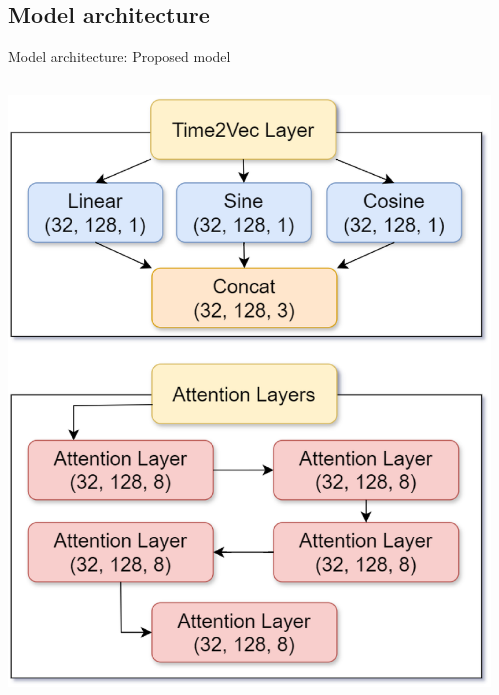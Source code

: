 \documentclass[compress, mathserif, fleqn, 10pt]{beamer}
\begin{document}
	\subsection{Model architecture}
	\begin{frame}{Model architecture: Proposed model}
		\begin{columns}
			\begin{column}{0.45\textwidth}
				\centerline{\includegraphics[width=\textwidth]{images/model-parts.eps}}
			\end{column}
			\begin{column}{0.45\textwidth}

\end{column}
\end{columns}
\end{frame}
\end{document}
